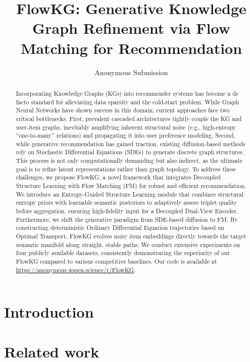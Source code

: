 \documentclass[letterpaper]{article} %
\title{FlowKG: Generative Knowledge Graph Refinement via Flow Matching for Recommendation}
\author{Anonymous Submission}
\begin{document}
\maketitle

\begin{abstract}
	Incorporating Knowledge Graphs (KGs) into recommender systems has become a de facto standard for alleviating data sparsity and the cold-start problem. While Graph Neural Networks have shown success in this domain, current approaches face two critical bottlenecks. First, prevalent cascaded architectures tightly couple the KG and user-item graphs, inevitably amplifying inherent structural noise (e.g., high-entropy ``one-to-many'' relations) and propagating it into user preference modeling. Second, while generative recommendation has gained traction, existing diffusion-based methods rely on Stochastic Differential Equations (SDEs) to generate discrete graph structures. This process is not only computationally demanding but also indirect, as the ultimate goal is to refine latent representations rather than graph topology. To address these challenges, we propose FlowKG, a novel framework that integrates Decoupled Structure Learning with Flow Matching (FM) for robust and efficient recommendation. We introduce an Entropy-Guided Structure Learning module that combines structural entropy priors with learnable semantic posteriors to adaptively assess triplet quality before aggregation, ensuring high-fidelity input for a Decoupled Dual-View Encoder. Furthermore, we shift the generative paradigm from SDE-based diffusion to FM. By constructing deterministic Ordinary Differential Equation trajectories based on Optimal Transport, FlowKG evolves noisy item embeddings directly towards the target semantic manifold along straight, stable paths. We conduct extensive experiments on four publicly available datasets, consistently demonstrating the superiority of our FlowKG compared to various competitive baselines. Our code is available at \url{https://anonymous.4open.science/r/FlowKG}.
\end{abstract}

\section{Introduction}
\label{sec:introduction}


\section{Related work}
\label{sec:relatedwork}

\end{document}
